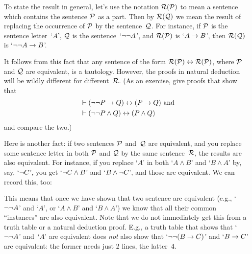 To state the result in general, let's use the notation $\mathcal{R}(\mathcal{P})$ to mean a sentence which contains the sentence $\mathcal{P}$ as a part. Then by $\mathcal{R}(\mathcal{Q})$ we mean the result of replacing the occurrence of $\mathcal{P}$ by the sentence~$\mathcal{Q}$.  For instance, if $\mathcal{P}$ is the sentence letter~`$A$', $\mathcal{Q}$ is the sentence~`$\neg\neg A$', and $\mathcal{R}(\mathcal{P})$ is `$A \rightarrow B$', then $\mathcal{R}(\mathcal{Q})$ is `$\neg\neg A \rightarrow B$'.


It follows from this fact that any sentence of the form $\mathcal{R}(\mathcal{P}) \leftrightarrow \mathcal{R}(\mathcal{P})$, where $\mathcal{P}$ and $\mathcal{Q}$ are equivalent, is a tautology. However, the proofs in natural deduction will be wildly different for different~$\mathcal{R}$. (As an exercise, give proofs that show that 
\begin{align*}
	& \vdash (\neg\neg P \rightarrow Q) \leftrightarrow (P \rightarrow Q)  \text{ and}\\
	& \vdash (\neg\neg P \wedge Q) \leftrightarrow (P \wedge Q)
\end{align*}
and compare the two.)

Here is another fact: if two sentences $\mathcal{P}$ and~$\mathcal{Q}$ are equivalent, and you replace some sentence letter in both $\mathcal{P}$ and $\mathcal{Q}$ by the same sentence~$\mathcal{R}$, the results are also equivalent.  For instance, if you replace `$A$' in both `$A \land B$' and `$B \land A$' by, say, `$\neg C$', you get `$\neg C \land B$' and `$B \land \neg C$', and those are equivalent. We can record this, too:


This means that once we have shown that two sentence are equivalent (e.g., `$\neg\neg A$' and `$A$', or `$A \land B$' and `$B \land A$') we know that all their common ``instances'' are also equivalent.  Note that we do not immediately get this from a truth table or a natural deduction proof. E.g., a truth table that shows that `$\neg\neg A$' and~`$A$' are equivalent does \emph{not} also show that `$\neg\neg(B \rightarrow C)$' and `$B \rightarrow C$' are equivalent: the former needs just 2 lines, the latter~4.


